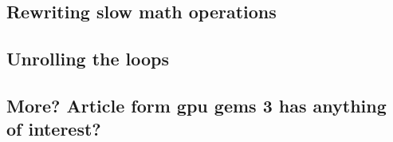 \subsection{Rewriting slow math operations}


\subsection{Unrolling the loops}









\subsection{More? Article form gpu gems 3 has anything of interest?}

